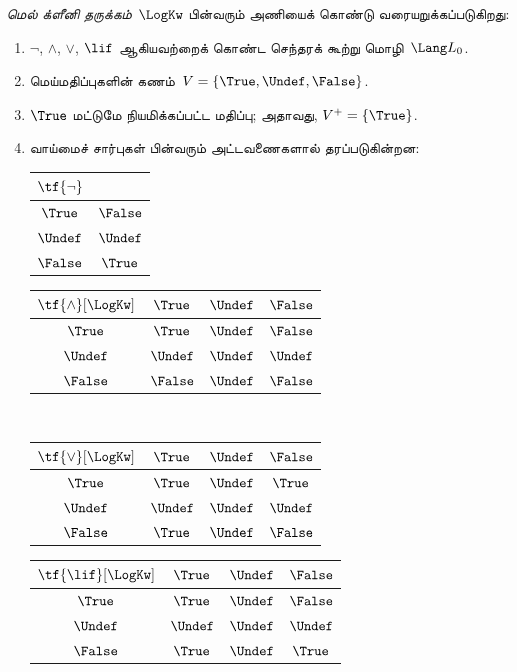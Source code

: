 \documentclass[../../../include/open-logic-section]{subfiles}
\begin{document}
\begin{defn}
\emph{மெல் க்ளீனி தருக்கம்}~$\LogKw$ பின்வரும் அணியைக் கொண்டு
வரையறுக்கப்படுகிறது:
\begin{enumerate}
  \item $\lnot$, $\land$, $\lor$, $\lif$ ஆகியவற்றைக் கொண்ட செந்தரக்
  கூற்று மொழி~$\Lang L_0$.
  \item மெய்மதிப்புகளின் கணம்~$V = \{\True, \Undef, \False\}$.
  \item $\True$ மட்டுமே நியமிக்கப்பட்ட மதிப்பு; அதாவது,
  $V^+ = \{\True\}$.
  \item வாய்மைச் சார்புகள் பின்வரும் அட்டவணைகளால் தரப்படுகின்றன:
  \begin{center}
    \begin{tabular}{c|c}
      $\tf{\lnot}$ & \\
      \hline
      $\True$ & $\False$ \\
      $\Undef$ & $\Undef$ \\
      $\False$ & $\True$
    \end{tabular}
    \quad
    \begin{tabular}{c|ccc}
      $\tf{\land}[\LogKw]$ & $\True$ & $\Undef$ & $\False$ \\
      \hline
      $\True$ & $\True$ & $\Undef$ & $\False$ \\
      $\Undef$ & $\Undef$ & $\Undef$ & $\Undef$\\
      $\False$ & $\False$ & $\Undef$ & $\False$
    \end{tabular}
    \\[2ex]
    \begin{tabular}{c|ccc}
      $\tf{\lor}[\LogKw]$ & $\True$ & $\Undef$ & $\False$ \\
      \hline
      $\True$ & $\True$ & $\Undef$ & $\True$ \\
      $\Undef$ & $\Undef$ & $\Undef$ & $\Undef$ \\
      $\False$ & $\True$ & $\Undef$ & $\False$
    \end{tabular}
    \quad
    \begin{tabular}{c|ccc}
      $\tf{\lif}[\LogKw]$ & $\True$ & $\Undef$ & $\False$ \\
      \hline
      $\True$ & $\True$ & $\Undef$ & $\False$ \\
      $\Undef$ & $\Undef$ & $\Undef$ & $\Undef$  \\
      $\False$ & $\True$ & $\Undef$ & $\True$
    \end{tabular}
  \end{center}
\end{enumerate}
\end{defn}
\end{document}
